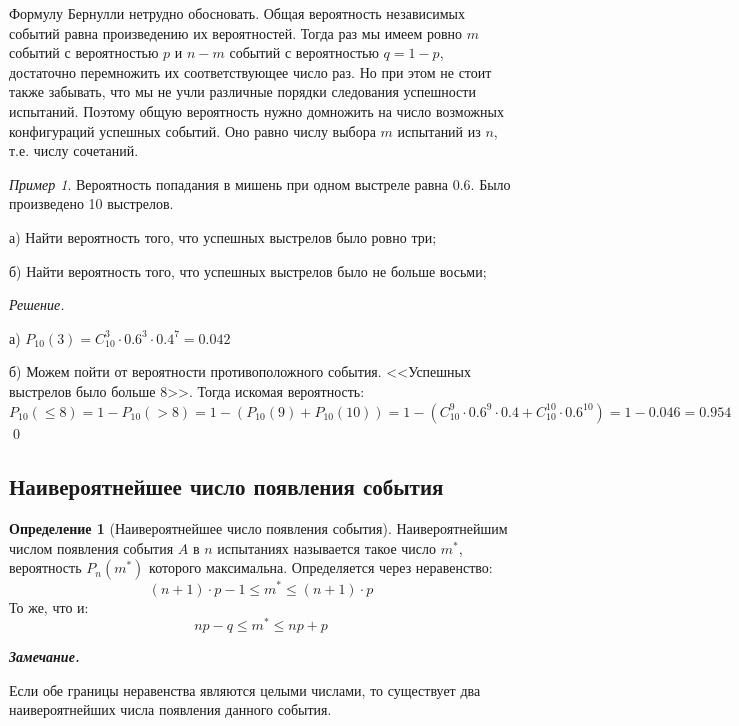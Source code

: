 \documentclass[12pt,a4paper]{article}
\theoremstyle{definition}
\newtheorem{definition}{Определение}[section]
\theoremstyle{definition}
\theoremstyle{remark}
\newenvironment{remark}{
  \par\noindent\textbf{\textit{Замечание.}}~
}{\par}
\theoremstyle{corollary}
\theoremstyle{bolditalic}
\newtheorem{example}{Пример}[section]
\newenvironment{solution}{
    \vspace{0.5em}
    \noindent\textit{Решение.}
}{\qed\vspace{1em}}
\begin{document}
Формулу Бернулли нетрудно обосновать. Общая вероятность независимых событий равна произведению их вероятностей. Тогда раз мы имеем ровно $m$ событий с вероятностью $p$ и $n-m$ событий с вероятностью $q=1-p$, достаточно перемножить их соответствующее число раз. Но при этом не стоит также забывать, что мы не учли различные порядки следования успешности испытаний. Поэтому общую вероятность нужно домножить на число возможных конфигураций успешных событий. Оно равно числу выбора $m$ испытаний из $n$, т.е. числу сочетаний.

\begin{example}
    Вероятность попадания в мишень при одном выстреле равна 0.6. Было произведено 10 выстрелов.

    а) Найти вероятность того, что успешных выстрелов было ровно три;
    
    б) Найти вероятность того, что успешных выстрелов было не больше восьми;
\end{example}

\begin{solution}

    а) $P_{10}(3)=C_{10}^3\cdot 0.6^3\cdot 0.4^7=0.042$

    б) Можем пойти от вероятности противоположного события. <<Успешных выстрелов было больше 8>>. Тогда искомая вероятность: $P_{10}(\le8)=1-P_{10}(>8)=1-(P_{10}(9) + P_{10}(10))=1-(C_{10}^9\cdot 0.6^9\cdot 0.4+C_{10}^{10}\cdot 0.6^{10})=1-0.046=0.954$
\end{solution}

\subsection{Наивероятнейшее число появления события}

\begin{definition}[Наивероятнейшее число появления события]
    Наивероятнейшим числом появления события $A$ в $n$ испытаниях называется такое число $m^*$, вероятность $P_n(m^*)$ которого максимальна. Определяется через неравенство:
    \[
    (n+1)\cdot p - 1\le m^* \le (n+1)\cdot p
    \]
    То же, что и:
    \[
    np-q\le m^* \le np+p
    \]
\end{definition}

\begin{remark}
    Если обе границы неравенства являются целыми числами, то существует два наивероятнейших числа появления данного события.
\end{remark}
\end{document}
